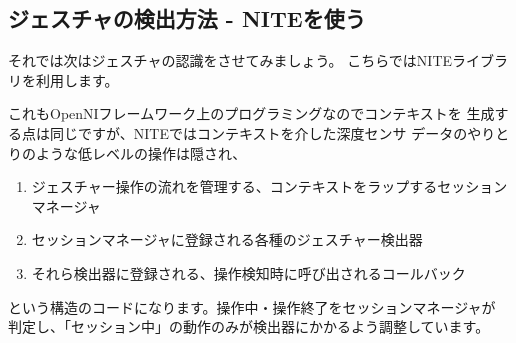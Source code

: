 \documentclass[mingoth,a4paper]{jsarticle}
\begin{document}
\subsection{ジェスチャの検出方法 - NITEを使う}
それでは次はジェスチャの認識をさせてみましょう。
こちらではNITEライブラリを利用します。

これもOpenNIフレームワーク上のプログラミングなのでコンテキストを
生成する点は同じですが、NITEではコンテキストを介した深度センサ
データのやりとりのような低レベルの操作は隠され、
\begin{enumerate}
\item ジェスチャー操作の流れを管理する、コンテキストをラップするセッションマネージャ
\item セッションマネージャに登録される各種のジェスチャー検出器
\item それら検出器に登録される、操作検知時に呼び出されるコールバック
\end{enumerate}
という構造のコードになります。操作中・操作終了をセッションマネージャが
判定し、「セッション中」の動作のみが検出器にかかるよう調整しています。
\end{document}
